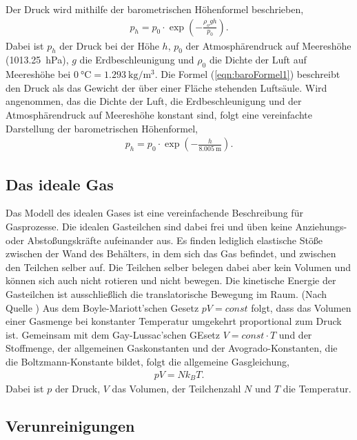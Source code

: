 Der Druck wird mithilfe der barometrischen Höhenformel beschrieben,
\begin{align}
    \label{eqn:baroFormel1}
    p_h = p_0\cdot \exp\left({-\frac{\rho_o gh}{p_0}}\right).
\end{align}
Dabei ist $p_h$ der Druck bei der Höhe $h$, $p_0$ der Atmosphärendruck auf Meereshöhe (\SI{1013,25}{\hecto\pascal}), $g$ die Erdbeschleunigung und $\rho_0$ die Dichte der Luft
auf Meereshöhe bei $\SI{0}{\celsius} = \SI{1,293}{\kilo\gram\per\meter\cubed}$. Die Formel (\ref{eqn:baroFormel1}) beschreibt den Druck als das Gewicht der über einer Fläche
stehenden Luftsäule. 
Wird angenommen, das die Dichte der Luft, die Erdbeschleunigung und der Atmosphärendruck auf Meereshöhe konstant sind, folgt eine vereinfachte Darstellung der barometrischen
Höhenformel,
\begin{align}
    \label{eqn:baroFormel2}
    p_h = p_0\cdot\exp\left(-\frac{h}{\SI{8,005}{\meter}}\right).
\end{align}

\subsection{Das ideale Gas}
\label{subsec:idGas}

Das Modell des idealen Gases ist eine vereinfachende Beschreibung für Gasprozesse. Die idealen Gasteilchen sind dabei frei und üben keine Anziehungs- oder Abstoßungskräfte 
aufeinander aus. Es finden lediglich elastische Stöße zwischen der Wand des Behälters, in dem sich das Gas befindet, und zwischen den Teilchen selber auf. Die Teilchen selber
belegen dabei aber kein Volumen und können sich auch nicht rotieren und nicht bewegen. Die kinetische Energie der Gasteilchen ist ausschließlich die translatorische Bewegung
im Raum. \newline
(Nach Quelle \cite{EinfuehrungVakuum}) Aus dem Boyle-Mariott'schen Gesetz $pV=const$ folgt, dass das Volumen einer Gasmenge bei konstanter Temperatur umgekehrt proportional zum Druck
ist. Gemeinsam mit dem Gay-Lussac'schen GEsetz $V=const\cdot T$ und der Stoffmenge, der allgemeinen Gaskonstanten und der Avogrado-Konstanten, die die Boltzmann-Konstante bildet,
folgt die allgemeine Gasgleichung,
\begin{align}
    \label{eqn:allgGasgl}
    pV=Nk_BT.
\end{align}
Dabei ist $p$ der Druck, $V$ das Volumen, der Teilchenzahl $N$ und $T$ die Temperatur.

\subsection{Verunreinigungen}
\label{subsec:verunreinigungen}

